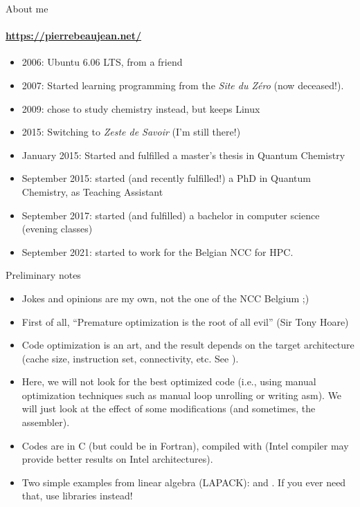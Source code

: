 \begin{frame}{About me}
	\framesubtitle{
		\url{https://pierrebeaujean.net/}}
	\begin{itemize}
		\item 2006: Ubuntu 6.06 LTS, from a friend
		\item 2007: Started learning programming from the \textit{Site du Zéro} (now deceased!).
		\item 2009: chose to study chemistry instead, but keeps Linux
		\item 2015: Switching to \textit{Zeste de Savoir} (I'm still there!)
		\item January 2015: Started and fulfilled a master’s thesis in Quantum Chemistry
		\item September 2015: started (and recently fulfilled!) a PhD in Quantum Chemistry, as Teaching Assistant
		\item September 2017: started (and fulfilled) a bachelor in computer science (evening classes)
		\item September 2021: started to work for the Belgian NCC for HPC.
	\end{itemize}
	
\end{frame}

\begin{frame}{Preliminary notes}
	\begin{itemize}
		\item Jokes and opinions are my own, not the one of the NCC Belgium ;)
		\item First of all, ``Premature optimization is the root of all evil'' (Sir Tony Hoare)
		\item Code optimization is an art, and the result depends on the target architecture (cache size, instruction set, connectivity, etc. See ).
		\item Here, we will not look for the best optimized code (i.e., using manual optimization techniques such as manual loop unrolling or writing asm). We will just look at the effect of some modifications (and sometimes, the assembler).
		\item Codes are in C (but could be in Fortran), compiled with  (Intel compiler may provide better results on Intel architectures). 
		\item Two simple examples from linear algebra (LAPACK):  and . If you ever need that, use libraries instead!
	\end{itemize}
\end{frame}

